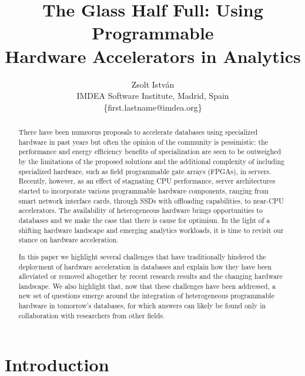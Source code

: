 \documentclass[11pt]{article}
\begin{document}
\title{The Glass Half Full: Using Programmable \\ Hardware Accelerators in Analytics
}
\author{Zsolt Istv\'{a}n\\ \small IMDEA Software Institute, Madrid, Spain\\  \small \{first.lastname@imdea.org\}}

\maketitle

\begin{abstract}
There have been numeorus proposals to accelerate databases using specialized hardware in past years but 
often the opinion of the community is pessimistic: the performance and energy efficiency benefits of 
specialization are seen to be outweighed by the limitations of the proposed solutions and the 
additional complexity of including specialized hardware, such as field programmable gate arrays (FPGAs), 
in servers. Recently, however, as an effect of stagnating CPU performance, server architectures started to incorporate various programmable hardware components, ranging from smart network interface cards, through SSDs with offloading capabilities, to near-CPU accelerators. The availability of heterogeneous hardware brings opportunities
to databases and we make the case that there is cause for optimism. In the light of a shifting hardware landscape 
and emerging analytics workloads, it is time to revisit our stance on hardware acceleration. 

In this paper we highlight several challenges that have traditionally hindered the deployment of hardware acceleration in databases and explain how they have been alleviated or removed altogether by recent research results and the changing hardware landscape. We also highlight that, now that these challenges have been addressed, a new set of questions emerge around the integration of heterogeneous programmable hardware in tomorrow's databases, for which answers can likely be found only in collaboration with researchers from other fields.

\end{abstract}

\section{Introduction}
\end{document}
